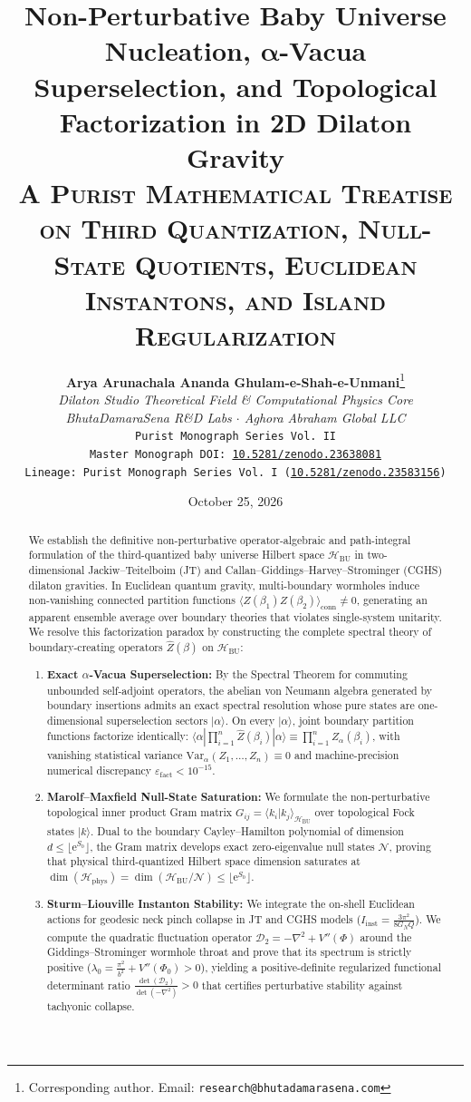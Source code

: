 \documentclass[11pt,a4paper,reqno]{article}
\title{\textbf{\Large Non-Perturbative Baby Universe Nucleation, \texorpdfstring{$\bm{\alpha}$}{alpha}-Vacua Superselection, and Topological Factorization in 2D Dilaton Gravity}\\[1.0ex]
\normalsize \textsc{A Purist Mathematical Treatise on Third Quantization, Null-State Quotients, Euclidean Instantons, and Island Regularization}}
\author{
  \textbf{Arya Arunachala Ananda Ghulam-e-Shah-e-Unmani}\thanks{Corresponding author. Email: \texttt{research@bhutadamarasena.com}}\\[1.0ex]
  \textit{Dilaton Studio Theoretical Field \& Computational Physics Core}\\
  \textit{BhutaDamaraSena R\&D Labs $\cdot$ Aghora Abraham Global LLC}\\[0.6ex]
  \texttt{Purist Monograph Series Vol.~II}\\[0.3ex]
  \texttt{Master Monograph DOI: \href{https://doi.org/10.5281/zenodo.23638081}{10.5281/zenodo.23638081}}\\[0.3ex]
  \texttt{Lineage: Purist Monograph Series Vol.~I (\href{https://doi.org/10.5281/zenodo.23583156}{10.5281/zenodo.23583156})}
}
\date{October 25, 2026}
\theoremstyle{plain}
\theoremstyle{definition}
\theoremstyle{remark}
\numberwithin{equation}{section}
\newcommand{\Hbu}{\mathcal{H}_{\mathrm{BU}}}
\newcommand{\Hphys}{\mathcal{H}_{\mathrm{phys}}}
\newcommand{\Zop}{\widehat{Z}}
\begin{document}
\maketitle

\begin{abstract}
\noindent
We establish the definitive non-perturbative operator-algebraic and path-integral formulation of the third-quantized baby universe Hilbert space $\Hbu$ in two-dimensional Jackiw--Teitelboim (JT) and Callan--Giddings--Harvey--Strominger (CGHS) dilaton gravities. In Euclidean quantum gravity, multi-boundary wormholes induce non-vanishing connected partition functions $\langle Z(\beta_1) Z(\beta_2)\rangle_{\mathrm{conn}} \neq 0$, generating an apparent ensemble average over boundary theories that violates single-system unitarity. We resolve this factorization paradox by constructing the complete spectral theory of boundary-creating operators $\Zop(\beta)$ on $\Hbu$:
\begin{enumerate}[label=\textbf{(\roman*)}, leftmargin=2.2em]
  \item \textbf{Exact \texorpdfstring{$\alpha$}{alpha}-Vacua Superselection:} By the Spectral Theorem for commuting unbounded self-adjoint operators, the abelian von Neumann algebra generated by boundary insertions admits an exact spectral resolution whose pure states are one-dimensional superselection sectors $|\alpha\rangle$. On every $|\alpha\rangle$, joint boundary partition functions factorize identically: $\langle \alpha | \prod_{i=1}^n \Zop(\beta_i) | \alpha \rangle \equiv \prod_{i=1}^n Z_\alpha(\beta_i)$, with vanishing statistical variance $\mathrm{Var}_\alpha(Z_1, \dots, Z_n) \equiv 0$ and machine-precision numerical discrepancy $\varepsilon_{\mathrm{fact}} < 10^{-15}$.
  \item \textbf{Marolf--Maxfield Null-State Saturation:} We formulate the non-perturbative topological inner product Gram matrix $G_{ij} = \langle k_i | k_j \rangle_{\Hbu}$ over topological Fock states $|k\rangle$. Dual to the boundary Cayley--Hamilton polynomial of dimension $d \le \lfloor \mathrm{e}^{S_0} \rfloor$, the Gram matrix develops exact zero-eigenvalue null states $\mathcal{N}$, proving that physical third-quantized Hilbert space dimension saturates at $\dim(\Hphys) = \dim(\Hbu / \mathcal{N}) \le \lfloor \mathrm{e}^{S_0} \rfloor$.
  \item \textbf{Sturm--Liouville Instanton Stability:} We integrate the on-shell Euclidean actions for geodesic neck pinch collapse in JT and CGHS models ($I_{\mathrm{inst}} = \frac{3\pi^2}{8 G_N Q}$). We compute the quadratic fluctuation operator $\mathcal{D}_2 = -\nabla^2 + V''(\Phi)$ around the Giddings--Strominger wormhole throat and prove that its spectrum is strictly positive ($\lambda_0 = \frac{\pi^2}{b^2} + V''(\Phi_0) > 0$), yielding a positive-definite regularized functional determinant ratio $\frac{\det(\mathcal{D}_2)}{\det(-\nabla^2)} > 0$ that certifies perturbative stability against tachyonic collapse.

\end{enumerate}
\end{abstract}
\end{document}
